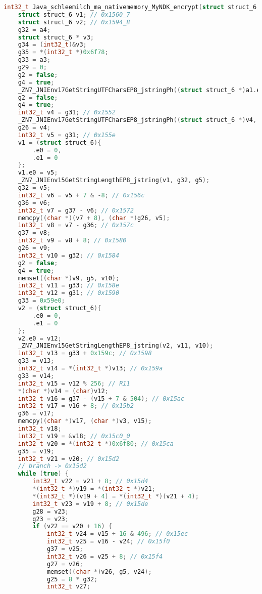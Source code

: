 \begin{appendices}
\begin{lstlisting}[language=C++, caption=Decompiled AES Encrypt(), label=dec_aes_encrypt]
int32_t Java_schleemilch_ma_nativememory_MyNDK_encrypt(struct struct_6 a1, int32_t a2, int32_t a3, int32_t a4, int32_t a5, int32_t a6, int32_t a7, int32_t a8, int32_t a9, int32_t a10, int32_t a11) {
    struct struct_6 v1; // 0x1560_7
    struct struct_6 v2; // 0x1594_8
    g32 = a4;
    struct struct_6 * v3;
    g34 = (int32_t)&v3;
    g35 = *(int32_t *)0x6f78;
    g33 = a3;
    g29 = 0;
    g2 = false;
    g4 = true;
    _ZN7_JNIEnv17GetStringUTFCharsEP8_jstringPh((struct struct_6 *)a1.e0, (char *)a3);
    g2 = false;
    g4 = true;
    int32_t v4 = g31; // 0x1552
    _ZN7_JNIEnv17GetStringUTFCharsEP8_jstringPh((struct struct_6 *)v4, (char *)g32);
    g26 = v4;
    int32_t v5 = g31; // 0x155e
    v1 = (struct struct_6){
        .e0 = 0,
        .e1 = 0
    };
    v1.e0 = v5;
    _ZN7_JNIEnv15GetStringLengthEP8_jstring(v1, g32, g5);
    g32 = v5;
    int32_t v6 = v5 + 7 & -8; // 0x156c
    g36 = v6;
    int32_t v7 = g37 - v6; // 0x1572
    memcpy((char *)(v7 + 8), (char *)g26, v5);
    int32_t v8 = v7 - g36; // 0x157c
    g37 = v8;
    int32_t v9 = v8 + 8; // 0x1580
    g26 = v9;
    int32_t v10 = g32; // 0x1584
    g2 = false;
    g4 = true;
    memset((char *)v9, g5, v10);
    int32_t v11 = g33; // 0x158e
    int32_t v12 = g31; // 0x1590
    g33 = 0x59e0;
    v2 = (struct struct_6){
        .e0 = 0,
        .e1 = 0
    };
    v2.e0 = v12;
    _ZN7_JNIEnv15GetStringLengthEP8_jstring(v2, v11, v10);
    int32_t v13 = g33 + 0x159c; // 0x1598
    g33 = v13;
    int32_t v14 = *(int32_t *)v13; // 0x159a
    g33 = v14;
    int32_t v15 = v12 % 256; // R11
    *(char *)v14 = (char)v12;
    int32_t v16 = g37 - (v15 + 7 & 504); // 0x15ac
    int32_t v17 = v16 + 8; // 0x15b2
    g36 = v17;
    memcpy((char *)v17, (char *)v3, v15);
    int32_t v18;
    int32_t v19 = &v18; // 0x15c0_0
    int32_t v20 = *(int32_t *)0x6f80; // 0x15ca
    g35 = v19;
    int32_t v21 = v20; // 0x15d2
    // branch -> 0x15d2
    while (true) {
        int32_t v22 = v21 + 8; // 0x15d4
        *(int32_t *)v19 = *(int32_t *)v21;
        *(int32_t *)(v19 + 4) = *(int32_t *)(v21 + 4);
        int32_t v23 = v19 + 8; // 0x15de
        g28 = v23;
        g23 = v23;
        if (v22 == v20 + 16) {
            int32_t v24 = v15 + 16 & 496; // 0x15ec
            int32_t v25 = v16 - v24; // 0x15f0
            g37 = v25;
            int32_t v26 = v25 + 8; // 0x15f4
            g27 = v26;
            memset((char *)v26, g5, v24);
            g25 = 8 * g32;
            int32_t v27;

\end{lstlisting}
\end{appendices}
